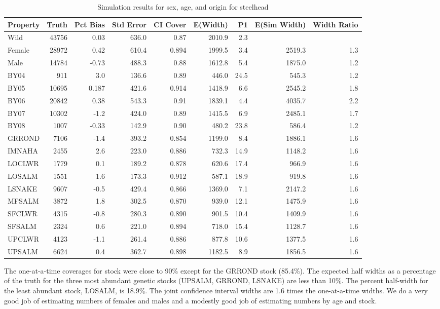 \documentclass[%
                leqno,         %
%
]{nrc1}                          %
\begin{document}
\begin{table} %
\caption{Simulation results for sex, age, and origin for steelhead}
\label{table:SHsimresults}
\footnotesize
\begin{tabular}{ | l | r | r | r | r | r | r | r | r | }
\hline
Property&Truth&Pct Bias&Std Error&CI Cover&E(Width)&P1&E(Sim Width)&Width Ratio \\ \hline
Wild&43756&0.03&636.0&0.87&2010.9&2.3&& \\ \hline
Female&28972&0.42&610.4&0.894&1999.5&3.4&2519.3&1.3 \\ \hline
Male&14784&-0.73&488.3&0.88&1612.8&5.4&1875.0&1.2 \\ \hline
BY04&911&3.0&136.6&0.89&446.0&24.5&545.3&1.2 \\ \hline
BY05&10695&0.187&421.6&0.914&1418.9&6.6&2545.2&1.8 \\ \hline
BY06&20842&0.38&543.3&0.91&1839.1&4.4&4035.7&2.2 \\ \hline
BY07&10302&-1.2&424.0&0.89&1415.5&6.9&2485.1&1.7 \\ \hline
BY08&1007&-0.33&142.9&0.90&480.2&23.8&586.4&1.2 \\ \hline
GRROND&7106&-1.4&393.2&0.854&1199.0&8.4&1886.1&1.6 \\ \hline
IMNAHA&2455&2.6&223.0&0.886&732.3&14.9&1148.2&1.6 \\ \hline
LOCLWR&1779&0.1&189.2&0.878&620.6&17.4&966.9&1.6 \\ \hline
LOSALM&1551&1.6&173.3&0.912&587.1&18.9&919.8&1.6 \\ \hline
LSNAKE&9607&-0.5&429.4&0.866&1369.0&7.1&2147.2&1.6 \\ \hline
MFSALM&3872&1.8&302.5&0.870&939.0&12.1&1475.9&1.6 \\ \hline
SFCLWR&4315&-0.8&280.3&0.890&901.5&10.4&1409.9&1.6 \\ \hline
SFSALM&2324&0.6&221.0&0.894&718.0&15.4&1128.7&1.6 \\ \hline
UPCLWR&4123&-1.1&261.4&0.886&877.8&10.6&1377.5&1.6 \\ \hline
UPSALM&6624&0.4&362.7&0.898&1182.5&8.9&1856.5&1.6 \\ \hline
\end{tabular}
\end{table}

The one-at-a-time coverages for stock were close to 90\% except for the GRROND stock (85.4\%). The expected half widths as a percentage of the truth for the three most abundant genetic stocks (UPSALM, GRROND, LSNAKE) are less than 10\%. The percent half-width for the least abundant stock, LOSALM, is 18.9\%.  The joint confidence interval widths are 1.6 times the one-at-a-time widths.  We do a very good job of estimating numbers of females and males and a modestly good job of estimating numbers by age and stock.
\end{document}
